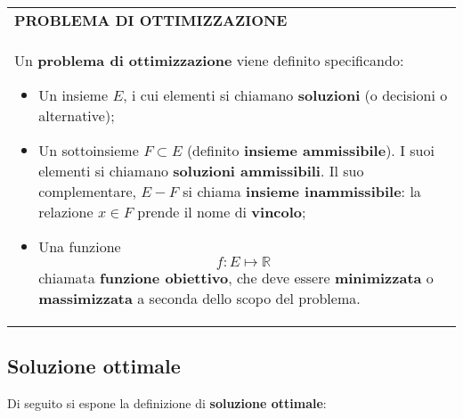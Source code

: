 \documentclass[a4paper]{extarticle}
\renewcommand\arraystretch{}
\begin{document}
\vspace{1em}
\setlength{\tabcolsep}{14pt}
\renewcommand{\arraystretch}{2}
\noindent
\begin{tabularx}{\textwidth}{@{}|P|@{}}
    \hline
    {\textbf{PROBLEMA DI OTTIMIZZAZIONE}}\\
    \parbox{\linewidth}{Un \textbf{problema di ottimizzazione} viene definito specificando:
    \begin{itemize}
        \item Un insieme $E$, i cui elementi si chiamano \textbf{soluzioni} (o decisioni o alternative);
        \item Un sottoinsieme $F \subset E$ (definito \textbf{insieme ammissibile}). I suoi elementi si chiamano \textbf{soluzioni ammissibili}. Il suo complementare, $E - F$ si chiama \textbf{insieme inammissibile}: la relazione $x \in F$ prende il nome di \textbf{vincolo};
        \item Una funzione
        \[f : E \longmapsto \mathbb{R}\]
        chiamata \textbf{funzione obiettivo}, che deve essere \textbf{minimizzata} o \textbf{massimizzata} a seconda dello scopo del problema.
    \end{itemize}
    \vspace{1mm}}\\
    \hline
\end{tabularx}

\vspace{2em}
\noindent
\subsection{Soluzione ottimale}
Di seguito si espone la definizione di \textbf{soluzione ottimale}:
\end{document}
